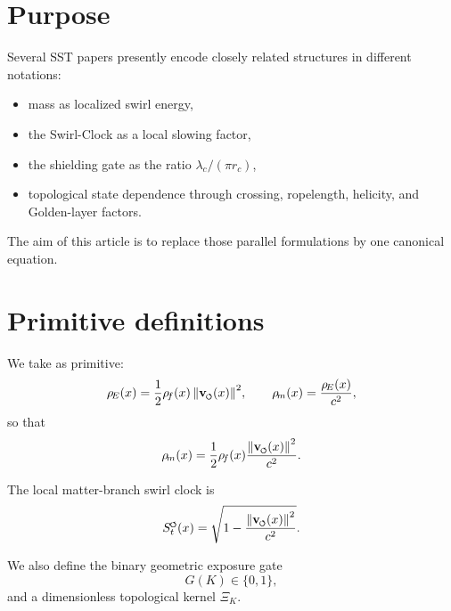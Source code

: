 \documentclass[11pt,a4paper]{article}
\newcommand{\swirlarrow}{\mathchoice{\mkern-2mu\scriptstyle\boldsymbol{\circlearrowleft}}{\mkern-2mu\scriptstyle\boldsymbol{\circlearrowleft}}{\mkern-2mu\scriptscriptstyle\boldsymbol{\circlearrowleft}}{\mkern-2mu\scriptscriptstyle\boldsymbol{\circlearrowleft}}}
\newcommand{\vswirl}{{\mathbf{v}_{\swirlarrow}}}
\newcommand{\SwirlClock}{{S_t^{\swirlarrow}}}
\newcommand{\rhoF}{\rho_{\!f}}
\newcommand{\rhoE}{\rho_{\!E}}
\newcommand{\rhoM}{\rho_{\!m}}
\providecommand{\rc}{r_c}
\begin{document}
        

        
        \section{Purpose}
            
            Several SST papers presently encode closely related structures in different notations:
            \begin{itemize}[leftmargin=1.5em]
\item mass as localized swirl energy,
\item the Swirl-Clock as a local slowing factor,
\item the shielding gate as the ratio \(\lambda_c/(\pi \rc)\),
\item topological state dependence through crossing, ropelength, helicity, and Golden-layer factors.
            \end{itemize}
            
            The aim of this article is to replace those parallel formulations by one canonical equation.
        
        \section{Primitive definitions}
            
            We take as primitive:
            \begin{equation}
                \rhoE(x)=\frac12 \rhoF(x)\,\norm{\vswirl(x)}^2,
                \qquad
                \rhoM(x)=\frac{\rhoE(x)}{c^2},
            \end{equation}
            so that
            \begin{equation}
                \rhoM(x)=\frac12 \rhoF(x)\frac{\norm{\vswirl(x)}^2}{c^2}.
            \end{equation}
            
            The local matter-branch swirl clock is
            \begin{equation}
                \SwirlClock(x)=\sqrt{1-\frac{\norm{\vswirl(x)}^2}{c^2}}.
            \end{equation}
            
            We also define the binary geometric exposure gate
            \begin{equation}
                G(K)\in\{0,1\},
            \end{equation}
            and a dimensionless topological kernel \(\Xi_K\).
            
\end{document}
